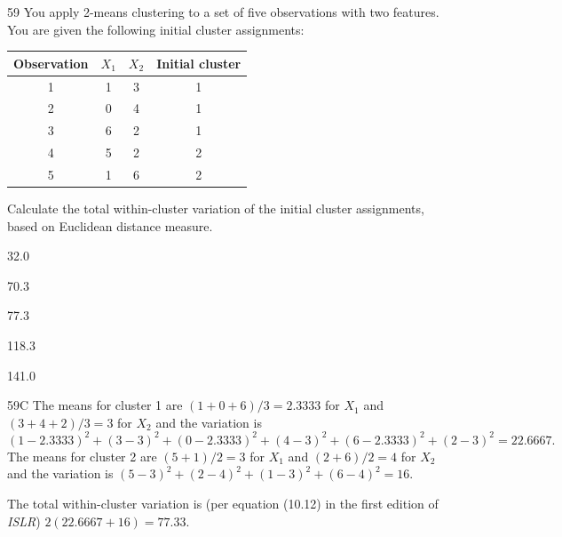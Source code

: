 \begin{question}{59}
You apply 2-means clustering to a set of five observations with two features. You are given the following initial cluster assignments:
\begin{center}
\begin{tabular}{|c|c|c|c|}
\hline
Observation & $X_1$ & $X_2$ & Initial cluster \\ \hline
1 & 1 & 3 & 1 \\ \hline
2 & 0 & 4 & 1 \\ \hline
3 & 6 & 2 & 1 \\ \hline
4 & 5 & 2 & 2 \\ \hline
5 & 1 & 6 & 2 \\ \hline
\end{tabular}
\end{center}

Calculate the total within-cluster variation of the initial cluster assignments, based on Euclidean distance measure.

\begin{choices}
\item 32.0
\item 70.3
\item 77.3
\item 118.3
\item 141.0
\end{choices}
\end{question}
\begin{solution}{59}{C}
The means for cluster 1 are $(1 + 0 + 6)/3 = 2.3333$ for $X_1$ and $(3 + 4 + 2)/3 = 3$ for $X_2$ and the variation is
\[ (1 - 2.3333)^2 + (3 - 3)^2 + (0 - 2.3333)^2 + (4 - 3)^2 + (6 - 2.3333)^2 + (2 - 3)^2 = 22.6667. \]
The means for cluster 2 are $(5 + 1)/2 = 3$ for $X_1$ and $(2 + 6)/2 = 4$ for $X_2$ and the variation is $(5 - 3)^2 + (2 - 4)^2 + (1 - 3)^2 + (6 - 4)^2 = 16$.

The total within-cluster variation is (per equation (10.12) in the first edition of \textit{ISLR}) $2(22.6667 + 16) = 77.33$.
\end{solution}

